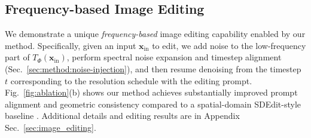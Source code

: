 \subsection{Frequency-based Image Editing}
\label{sec:exp:applications}
We demonstrate a unique \textit{frequency-based} image editing capability enabled by our method. Specifically, given an input $\mathbf{x}_\text{in}$ to edit, we add noise to the low-frequency part of $T_\Phi(\mathbf{x}_\text{in})$, perform spectral noise expansion and timestep alignment (Sec.~\ref{sec:method:noise-injection}), and then resume denoising from the timestep $t$ corresponding to the resolution schedule with the editing prompt. Fig.~\ref{fig:ablation}(b) shows our method achieves substantially improved prompt alignment and geometric consistency compared to a spatial-domain SDEdit-style baseline \cite{meng2022sdedit}. Additional details and editing results are in Appendix Sec.~\ref{sec:image_editing}.

